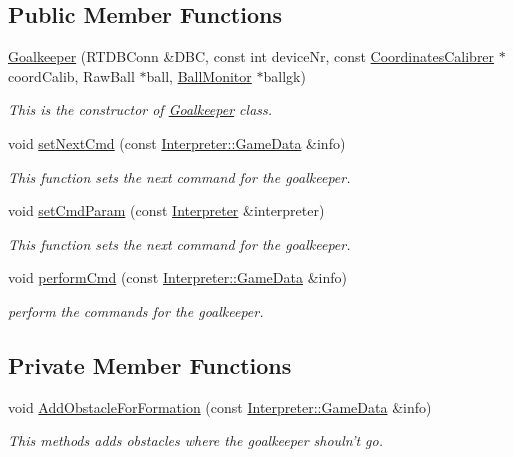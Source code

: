 \subsection*{Public Member Functions}
\begin{DoxyCompactItemize}
\item 
\hyperlink{classGoalkeeper_a7ad214162340c37a695ba00d4576c3c4}{Goalkeeper} (RTDBConn \&DBC, const int deviceNr, const \hyperlink{classCoordinatesCalibrer}{CoordinatesCalibrer} $\ast$coordCalib, RawBall $\ast$ball, \hyperlink{classBallMonitor}{BallMonitor} $\ast$ballgk)
\begin{DoxyCompactList}\small\item\em This is the constructor of \hyperlink{classGoalkeeper}{Goalkeeper} class. \item\end{DoxyCompactList}\item 
void \hyperlink{classGoalkeeper_abc394351f7c0d552c6e96da422c772ec}{setNextCmd} (const \hyperlink{structInterpreter_1_1GameData}{Interpreter::GameData} \&info)
\begin{DoxyCompactList}\small\item\em This function sets the next command for the goalkeeper. \item\end{DoxyCompactList}\item 
void \hyperlink{classGoalkeeper_acfa6fbad0f6b1627fd59cc7cce6ff321}{setCmdParam} (const \hyperlink{classInterpreter}{Interpreter} \&interpreter)
\begin{DoxyCompactList}\small\item\em This function sets the next command for the goalkeeper. \item\end{DoxyCompactList}\item 
void \hyperlink{classGoalkeeper_ab850d0d2278730bebc5479f1a339a925}{performCmd} (const \hyperlink{structInterpreter_1_1GameData}{Interpreter::GameData} \&info)
\begin{DoxyCompactList}\small\item\em perform the commands for the goalkeeper. \item\end{DoxyCompactList}\end{DoxyCompactItemize}
\subsection*{Private Member Functions}
\begin{DoxyCompactItemize}
\item 
void \hyperlink{classGoalkeeper_a5287a2e74795bbec8f0ead767655da5d}{AddObstacleForFormation} (const \hyperlink{structInterpreter_1_1GameData}{Interpreter::GameData} \&info)
\begin{DoxyCompactList}\small\item\em This methods adds obstacles where the goalkeeper shouln't go. \item\end{DoxyCompactList}\end{DoxyCompactItemize}
